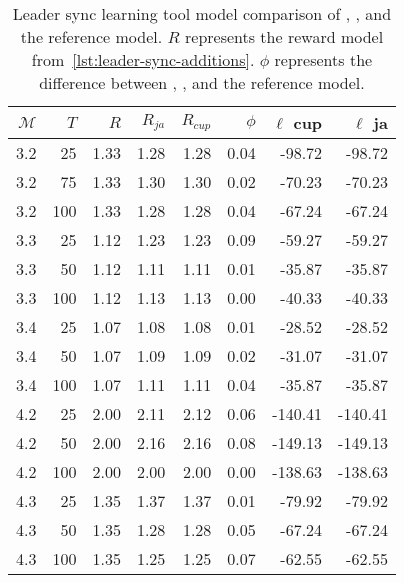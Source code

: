 \begin{table}
    \centering
    \caption{Leader sync learning tool model comparison of \Cupaal, \Jajapy, and the reference model. $R$ represents the reward model from~\autoref{lst:leader-sync-additions}. $\phi$ represents the difference between \Cupaal, \Jajapy, and the reference model.}
    \label{tab:leader-results-accuracy}
    \begin{tabular}{rrrrrrrr}
        \toprule
        $\mathcal{M}$ & $T$ & $R$  & $R_{ja}$ & $R_{cup}$ & $\phi$ & $\ell$ cup & $\ell$ ja \\
        \midrule
        3.2           & 25  & 1.33 & 1.28     & 1.28      & 0.04   & -98.72     & -98.72    \\
        3.2           & 75  & 1.33 & 1.30     & 1.30      & 0.02   & -70.23     & -70.23    \\
        3.2           & 100 & 1.33 & 1.28     & 1.28      & 0.04   & -67.24     & -67.24    \\
        3.3           & 25  & 1.12 & 1.23     & 1.23      & 0.09   & -59.27     & -59.27    \\
        3.3           & 50  & 1.12 & 1.11     & 1.11      & 0.01   & -35.87     & -35.87    \\
        3.3           & 100 & 1.12 & 1.13     & 1.13      & 0.00   & -40.33     & -40.33    \\
        3.4           & 25  & 1.07 & 1.08     & 1.08      & 0.01   & -28.52     & -28.52    \\
        3.4           & 50  & 1.07 & 1.09     & 1.09      & 0.02   & -31.07     & -31.07    \\
        3.4           & 100 & 1.07 & 1.11     & 1.11      & 0.04   & -35.87     & -35.87    \\
        4.2           & 25  & 2.00 & 2.11     & 2.12      & 0.06   & -140.41    & -140.41   \\
        4.2           & 50  & 2.00 & 2.16     & 2.16      & 0.08   & -149.13    & -149.13   \\
        4.2           & 100 & 2.00 & 2.00     & 2.00      & 0.00   & -138.63    & -138.63   \\
        4.3           & 25  & 1.35 & 1.37     & 1.37      & 0.01   & -79.92     & -79.92    \\
        4.3           & 50  & 1.35 & 1.28     & 1.28      & 0.05   & -67.24     & -67.24    \\
        4.3           & 100 & 1.35 & 1.25     & 1.25      & 0.07   & -62.55     & -62.55    \\

\end{tabular}
\end{table}
